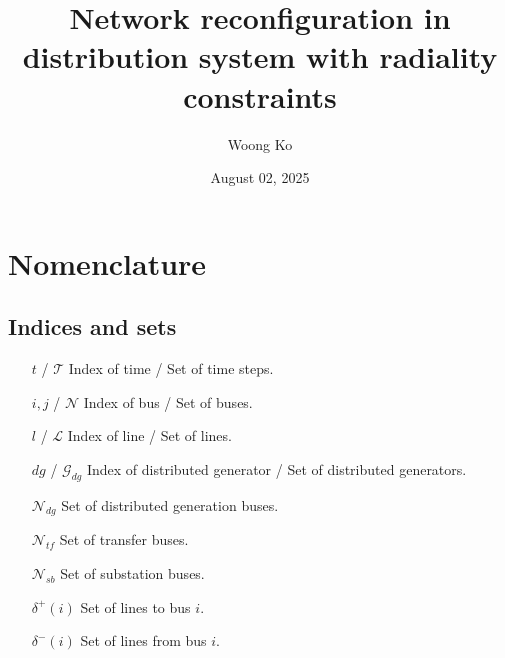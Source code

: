 \documentclass{article}
\title{Network reconfiguration in distribution system with radiality constraints}
\author{Woong Ko}
\date{August 02, 2025}
\begin{document}
\maketitle

\section*{Nomenclature}
\subsection*{Indices and sets}
\begin{itemize}
\item[$t$ / $\mathcal{T}$] Index of time / Set of time steps.
\item[$i, j$ / $\mathcal{N}$] Index of bus / Set of buses.
\item[$l$ / $\mathcal{L}$] Index of line / Set of lines.
\item[$dg$ / $\mathcal{G}_{dg}$] Index of distributed generator / Set of distributed generators.
\item[$\mathcal{N}_{dg}$] Set of distributed generation buses.
\item[$\mathcal{N}_{tf}$] Set of transfer buses.
\item[$\mathcal{N}_{sb}$] Set of substation buses.
\item[$\delta^{+}(i) $] Set of lines to bus $i$. 
\item[$\delta^{-}(i) $] Set of lines from bus $i$. 
\end{itemize}
\end{document}
